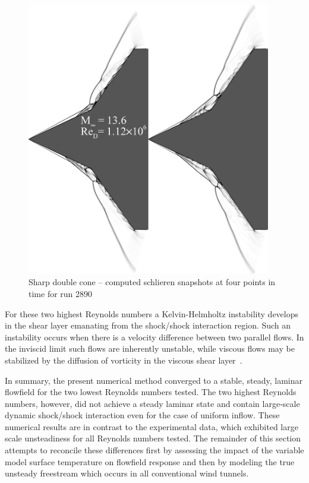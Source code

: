 \begin{figure}[hbtp]
  \begin{center}
    \includegraphics[width=0.95\textwidth]{figures/aedc_double_cone/2890/composite}
    \caption{Sharp double cone -- computed schlieren snapshots at four points in time for run 2890\label{fig:double_cone_AEDC_2890_unsteady}}
  \end{center}
\end{figure}

For these two highest Reynolds numbers a Kelvin-Helmholtz instability develops in the shear layer emanating from the shock/shock interaction region.  Such an instability occurs when there is a velocity difference between two parallel flows.  In the inviscid limit such flows are inherently unstable, while viscous flows may be stabilized by the diffusion of vorticity in the viscous shear layer~\cite{viscous_shear_instabilities}. 

In summary, the present numerical method converged to a stable, steady, laminar flowfield for the two lowest Reynolds numbers tested.  The two highest Reynolds numbers, however, did not achieve a steady laminar state and contain large-scale dynamic shock/shock interaction even for the case of uniform inflow.  These numerical results are in contrast to the experimental data, which exhibited large scale unsteadiness for all Reynolds numbers tested.  The remainder of this section attempts to reconcile these differences first by assessing the impact of the variable model surface temperature on flowfield response and then by modeling the true unsteady freestream which occurs in all conventional wind tunnels.

